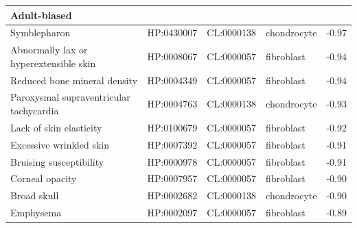 \documentclass[
]{article}
\begin{document}
\begin{table}
{\begin{tabular}[t]{l|l|l|l|r}
\hline
\multicolumn{5}{l}{\textbf{Adult-biased}}\\
\hline
\hspace{1em}Symblepharon & HP:0430007 & CL:0000138 & chondrocyte & -0.97\\
\hline
\hspace{1em}Abnormally lax or hyperextensible skin & HP:0008067 & CL:0000057 & fibroblast & -0.94\\
\hline
\hspace{1em}Reduced bone mineral density & HP:0004349 & CL:0000057 & fibroblast & -0.94\\
\hline
\hspace{1em}Paroxysmal supraventricular tachycardia & HP:0004763 & CL:0000138 & chondrocyte & -0.93\\
\hline
\hspace{1em}Lack of skin elasticity & HP:0100679 & CL:0000057 & fibroblast & -0.92\\
\hline
\hspace{1em}Excessive wrinkled skin & HP:0007392 & CL:0000057 & fibroblast & -0.91\\
\hline
\hspace{1em}Bruising susceptibility & HP:0000978 & CL:0000057 & fibroblast & -0.91\\
\hline
\hspace{1em}Corneal opacity & HP:0007957 & CL:0000057 & fibroblast & -0.90\\
\hline
\hspace{1em}Broad skull & HP:0002682 & CL:0000138 & chondrocyte & -0.90\\
\hline
\hspace{1em}Emphysema & HP:0002097 & CL:0000057 & fibroblast & -0.89\\
\hline
\end{tabular}

}

\end{table}%
\end{document}
